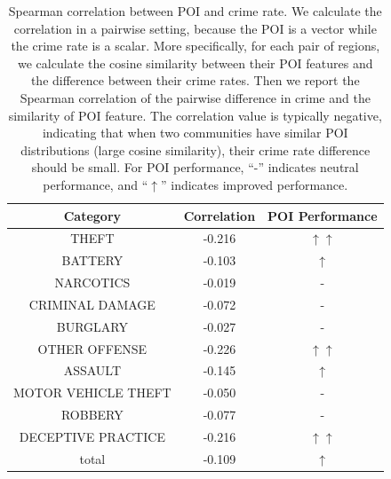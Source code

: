 \begin{table}
\centering
\caption{Spearman correlation between POI and crime rate. We calculate the correlation in a pairwise setting, because the POI is a vector while the crime rate is a scalar. More specifically, for each pair of regions, we calculate the cosine similarity between their POI features and the difference between their crime rates. Then we report the Spearman correlation of the pairwise difference in crime and the similarity of POI feature. The correlation value is typically negative, indicating that when two communities have similar POI distributions (large cosine similarity), their crime rate difference should be small. For POI performance, ``-'' indicates neutral performance, and ``$\uparrow$'' indicates improved performance.}
\label{tb:pairwise_poi}
\begin{tabular}{|c|c|c|}
  \hline
  Category & Correlation & POI Performance\\\hline
  THEFT & -0.216  & $\uparrow \uparrow$ \\\hline
  BATTERY & -0.103  & $\uparrow$ \\\hline
  NARCOTICS & -0.019 &  -\\\hline
  CRIMINAL DAMAGE & -0.072 &  -\\\hline
  BURGLARY & -0.027 & -\\\hline
  OTHER OFFENSE & -0.226 & $\uparrow \uparrow$ \\\hline
  ASSAULT & -0.145 &  $\uparrow$ \\\hline
  MOTOR VEHICLE THEFT & -0.050 &  -\\\hline
  ROBBERY & -0.077 & - \\\hline
  DECEPTIVE PRACTICE & -0.216 & $\uparrow \uparrow$ \\\hline
  total & -0.109 & $\uparrow$ \\\hline
\end{tabular}
\vspace{-3mm}
\end{table}
